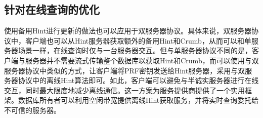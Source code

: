 \subsection{针对在线查询的优化}
\label{sec:optimized-model}
使用备用Hint进行更新的做法也可以应用于双服务器协议。具体来说，双服务器协议中，客户端也可以从Hint服务器获取额外的备用Hint和Crumb，从而可以和单服务器场景一样，在线查询时仅与一台服务器交互。但与单服务器协议不同的是，客户端与服务器并不需要流式传输整个数据库以获取Hint和Crumb，而可以使用与双服务器协议中类似的方式，让客户端将PRF密钥发送给Hint服务器，采用与双服务器协议中的离线Hint算法即可。如此，客户端可以避免与半诚实服务器进行在线交互，同时最大限度地减少离线通信。这一方案为服务提供商提供了一个实用框架。数据库所有者可以利用空闲带宽提供离线Hint获取服务，并将实时查询委托给不可信的服务器。